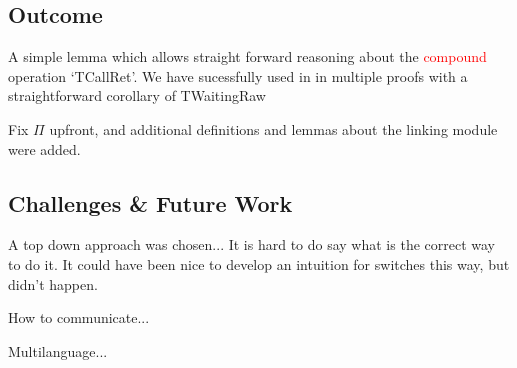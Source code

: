 \documentclass[runningheads, orivec]{llncs}
\begin{document}
\subsection{Outcome}

A simple lemma which allows straight forward reasoning about the \textcolor{red}{compound} operation `TCallRet'.
We have sucessfully used in in multiple proofs with a straightforward corollary of TWaitingRaw

Fix $\Pi$ upfront, and additional definitions and lemmas about the linking module were added.

\subsection{Challenges \& Future Work}

A top down approach was chosen...
It is hard to do say what is the correct way to do it. It could have been nice to develop an intuition for switches this way, but didn't happen.

How to communicate...

Multilanguage...



\end{document}
